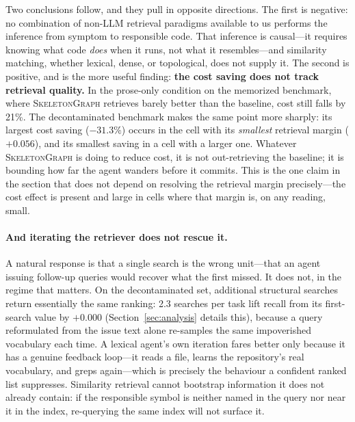 \documentclass[11pt,letterpaper]{article}
\newcommand{\sg}{\textsc{SkeletonGraph}}
\begin{document}
Two conclusions follow, and they pull in opposite directions. The first is
negative: no combination of non-LLM retrieval paradigms available to us performs
the inference from symptom to responsible code. That inference is causal---it
requires knowing what code \emph{does} when it runs, not what it resembles---and
similarity matching, whether lexical, dense, or topological, does not supply it.
The second is positive, and is the more useful finding: \textbf{the cost saving
does not track retrieval quality.} In the prose-only condition on the memorized
benchmark, where \sg{} retrieves barely better than the baseline, cost still falls
by 21\%. The decontaminated benchmark makes the same point more sharply: its
largest cost saving ($-31.3\%$) occurs in the cell with its \emph{smallest}
retrieval margin ($+0.056$), and its smallest saving in a cell with a larger one.
Whatever \sg{} is doing to reduce cost, it is not out-retrieving the baseline; it
is bounding how far the agent wanders before it commits. This is the one claim in
the section that does not depend on resolving the retrieval margin precisely---the
cost effect is present and large in cells where that margin is, on any reading,
small.

\paragraph{And iterating the retriever does not rescue it.}
A natural response is that a single search is the wrong unit---that an agent
issuing follow-up queries would recover what the first missed. It does not, in the
regime that matters. On the decontaminated set, additional structural searches
return essentially the same ranking: 2.3 searches per task lift recall from its
first-search value by $+0.000$ (Section~\ref{sec:analysis} details this), because a
query reformulated from the issue text alone re-samples the same impoverished
vocabulary each time. A lexical agent's own iteration fares better only because it
has a genuine feedback loop---it reads a file, learns the repository's real
vocabulary, and greps again---which is precisely the behaviour a confident ranked
list suppresses. Similarity retrieval cannot bootstrap information it does not
already contain: if the responsible symbol is neither named in the query nor near
it in the index, re-querying the same index will not surface it.
\end{document}
